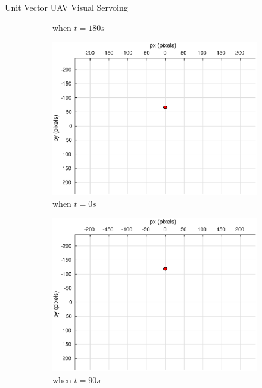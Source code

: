 \documentclass[9pt]{beamer}
\begin{document}
\begin{frame}{Unit Vector UAV Visual Servoing}
\begin{figure}[htbp]
\begin{subfigure}[t]{0.32\linewidth}
		\caption{when $t=180s$}
	\end{subfigure}
	\begin{subfigure}[t]{0.32\linewidth}
		\includegraphics[width=\textwidth]{chapter4/image_camera_5mps}
		\caption{when $t=0s$}
	\end{subfigure}
	\begin{subfigure}[t]{0.32\linewidth}
		\includegraphics[width=\textwidth]{chapter4/image_camera_5mps_90s}
		\caption{when $t=90s$}
	\end{subfigure}
	\begin{subfigure}[t]{0.32\linewidth}

\end{subfigure}
\end{figure}
\end{frame}
\end{document}
